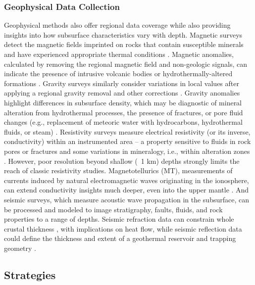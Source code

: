 \subsubsection{Geophysical Data Collection}
Geophysical methods also offer regional data coverage while also providing insights into how subsurface characteristics vary with depth. Magnetic surveys detect the magnetic fields imprinted on rocks that contain susceptible minerals and have experienced appropriate thermal conditions \citep[~p. 248-249]{lowrie_fundamentals_2007}. Magnetic anomalies, calculated by removing the regional magnetic field and non-geologic signals, can indicate the presence of intrusive volcanic bodies or hydrothermally-altered formations \citep[~p. 146]{glassley_geothermal_2015}. Gravity surveys similarly consider variations in local values after applying a regional gravity removal and other corrections \citep[~p. 59-62]{lowrie_fundamentals_2007}. Gravity anomalies highlight differences in subsurface density, which may be diagnostic of mineral alteration from hydrothermal processes, the presence of fractures, or pore fluid changes (e.g., replacement of meteoric water with hydrocarbons, hydrothermal fluids, or steam) \citep[~p. 150]{glassley_geothermal_2015}. Resistivity surveys measure electrical resistivity (or its inverse, conductivity) within an instrumented area – a property sensitive to fluids in rock pores or fractures and some variations in mineralogy, i.e., within alteration zones \citep[~p. 147]{glassley_geothermal_2015}. However, poor resolution beyond shallow (~1 km) depths strongly limits the reach of classic resistivity studies. Magnetotellurics (MT), measurements of currents induced by natural electromagnetic waves originating in the ionosphere, can extend conductivity insights much deeper, even into the upper mantle \citep[~p. 225]{lowrie_fundamentals_2007}. And seismic surveys, which measure acoustic wave propagation in the subsurface, can be processed and modeled to image stratigraphy, faults, fluids, and rock properties to a range of depths. Seismic refraction data can constrain whole crustal thickness \citep[e.g.][]{holmes_oceanic_2009}, with implications on heat flow, while seismic reflection data could define the thickness and extent of a geothermal reservoir and trapping geometry \citep[e.g.][]{cappetti_new_2005}.

\subsection{Strategies}
